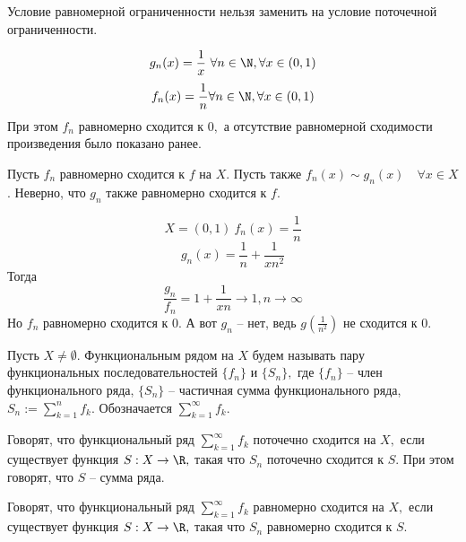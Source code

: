 \begin{note}
    Условие равномерной ограниченности нельзя заменить на условие поточечной ограниченности. 
\end{note}

\begin{example}
    $$g_n(x) = \frac{1}{x} \ \forall n \in \N, \forall x \in (0, 1)$$
    $$f_n(x) = \frac{1}{n} \forall n \in \N, \forall x \in (0, 1)$$
    При этом $f_n$ равномерно сходится к $0,$ а отсутствие равномерной сходимости произведения было показано ранее.
\end{example}

\begin{note}
    Пусть $f_n$ равномерно сходится к $f$ на $X.$ Пусть также $f_n(x) \sim g_n(x) \quad \forall x \in X$. Неверно, что $g_n$ также равномерно сходится к $f.$
\end{note}

\begin{example}
    $$X = (0, 1) \ f_n(x) = \frac{1}{n}$$
    $$g_n(x) = \frac{1}{n} + \frac{1}{xn^2}$$
    Тогда 
    $$\frac{g_n}{f_n} = 1 + \frac{1}{xn} \rightarrow 1, n \rightarrow \infty$$
    Но $f_n$ равномерно сходится к $0.$ А вот $g_n$ -- нет, ведь $g(\frac{1}{n^2})$ не сходится к $0.$
\end{example}

\begin{definition}
    Пусть $X \neq \emptyset.$ Функциональным рядом на $X$ будем называть пару функциональных последовательностей $\{f_n\}$ и $\{S_n\},$ где $\{f_n\}$ -- член функционального ряда, $\{S_n\}$ -- частичная сумма функционального ряда, $S_n := \sum_{k = 1}^{n} f_k.$ Обозначается $\sum_{k = 1}^{\infty} f_k.$
\end{definition}

\begin{definition}
    Говорят, что функциональный ряд $\sum_{k = 1}^{\infty} f_k$ поточечно сходится на $X,$ если существует функция $S: X \rightarrow \R,$ такая что $S_n$ поточечно сходится к $S.$ При этом говорят, что $S$ -- сумма ряда.
\end{definition}

\begin{definition}
    Говорят, что функциональный ряд $\sum_{k = 1}^{\infty} f_k$ равномерно сходится на $X,$ если существует функция $S: X \rightarrow \R,$ такая что $S_n$ равномерно сходится к $S.$ 
\end{definition}